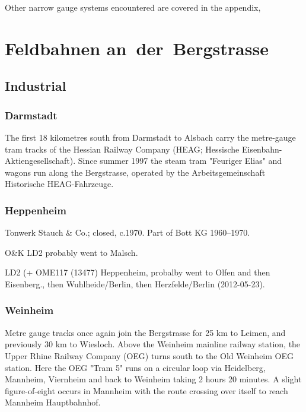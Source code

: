 \documentclass[a4paper]{report}
\begin{document}
Other narrow gauge systems encountered are covered in the appendix, 


\part{Feldbahnen an~der~Bergstrasse}

\chapter{Industrial}
\section{Darmstadt}

The first 18 kilometres south from Darmstadt to Alsbach carry the
metre-gauge tram tracks of the Hessian Railway Company (HEAG;
Hessische Eisenbahn-Aktiengesellschaft).  Since summer 1997 the steam
tram "Feuriger Elias" and wagons run along the Bergstrasse, operated
by the Arbeitsgemeinschaft Historische HEAG-Fahrzeuge.

\section{Heppenheim}

Tonwerk Stauch \& Co.; closed, c.1970.  Part of Bott KG 1960--1970.

O\&K LD2 probably went to Malsch.

LD2 (+ OME117 (13477) Heppenheim, probalby went to Olfen and then Eisenberg.\cite{Kurasch-2012-04-09,}, then Wuhlheide/Berlin, then Herzfelde/Berlin (2012-05-23)\cite{Frank-Engel-2012-05-23}.

\section{Weinheim}

Metre gauge tracks once again join the Bergstrasse for 25 km to
Leimen, and previously 30 km to Wiesloch.  Above the Weinheim mainline
railway station, the Upper Rhine Railway Company (OEG) turns south to
the Old Weinheim OEG station.  Here the OEG "Tram 5" runs on a
circular loop via Heidelberg, Mannheim, Viernheim and back to Weinheim
taking 2 hours 20 minutes.  A slight figure-of-eight occurs in
Mannheim with the route crossing over itself to reach Mannheim Hauptbahnhof.
\end{document}
